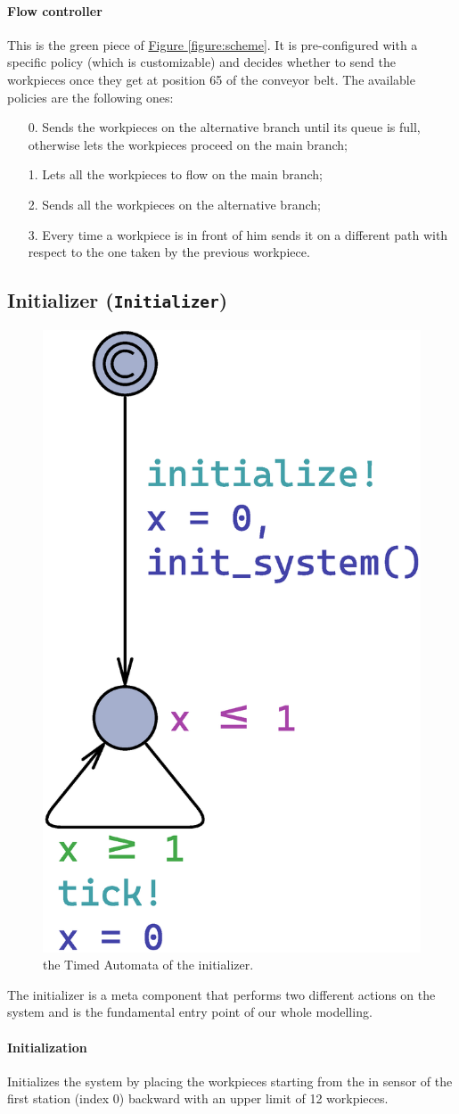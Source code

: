 \documentclass[a4paper]{article}
\newcommand{\figureref}[1]{\textsf{\hyperref[#1]{Figure \ref*{#1}}}}
\begin{document}
    \paragraph{Flow controller} This is the green piece of \figureref{figure:scheme}. It is pre-configured with a specific policy (which is customizable) and decides whether to send the workpieces once they get at position 65 of the conveyor belt. The available policies are the following ones:
    \begin{enumerate}
        \item[0.] Sends the workpieces on the alternative branch until its queue is full, otherwise lets the workpieces proceed on the main branch;
        \item[1.] Lets all the workpieces to flow on the main branch;
        \item[2.] Sends all the workpieces on the alternative branch;
        \item[3.] Every time a workpiece is in front of him sends it on a different path with respect to the one taken by the previous workpiece.
    \end{enumerate}

    \subsection{Initializer (\texttt{Initializer})}

    \begin{figure}[h!]
        \centering
        \includegraphics[width=0.12\columnwidth]{./images/automata/initializer}
        \caption{the Timed Automata of the initializer.}
    \end{figure}

    The initializer is a meta component that performs two different actions on the system and is the fundamental entry point of our whole modelling.

    \paragraph{Initialization} Initializes the system by placing the workpieces starting from the in sensor of the first station (index 0) backward with an upper limit of 12 workpieces.
\end{document}
